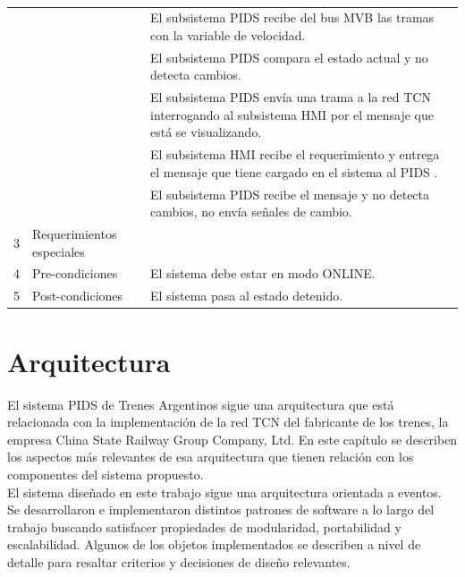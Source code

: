 \begin{table}[]
\begin{tabular}{|lll|}
\multicolumn{1}{|l|}{{ }} & \multicolumn{1}{l|}{{ }} & { El subsistema PIDS recibe del bus MVB las tramas con la variable de velocidad.} \\
 
\multicolumn{1}{|l|}{{ }} & \multicolumn{1}{l|}{{ }} & { El subsistema PIDS compara el estado actual y no detecta cambios.} \\
 
\multicolumn{1}{|l|}{{ }} & \multicolumn{1}{l|}{{ }} & { El subsistema PIDS envía una trama a la red TCN interrogando al subsistema HMI por el mensaje que está se visualizando.} \\
 
\multicolumn{1}{|l|}{{ }} & \multicolumn{1}{l|}{{ }} & { El subsistema HMI recibe el requerimiento y entrega el mensaje que tiene cargado en el sistema al PIDS .} \\
 
\multicolumn{1}{|l|}{{ }} & \multicolumn{1}{l|}{{ }} & { El subsistema PIDS recibe el mensaje y no detecta cambios, no envía señales de cambio.} \\ \hline
 
\multicolumn{1}{|r|}{{ 3}} & \multicolumn{1}{l|}{{ Requerimientos especiales}} & { } \\ \hline
 
\multicolumn{1}{|r|}{{ 4}} & \multicolumn{1}{l|}{{ Pre-condiciones}} & { El sistema debe estar en modo ONLINE.} \\ \hline
 
\multicolumn{1}{|r|}{{ 5}} & \multicolumn{1}{l|}{{ Post-condiciones}} & { El sistema pasa al estado detenido.} \\ \hline
\end{tabular}
\caption{}
\label{tab:my-table}
\end{table}


\pagebreak
\newpage
\section{Arquitectura}

El sistema PIDS de Trenes Argentinos sigue una arquitectura que está relacionada con la implementación de la red TCN del fabricante de los trenes, la empresa China State Railway Group Company, Ltd. En este capítulo se describen los aspectos más relevantes de esa arquitectura que tienen relación con los componentes del sistema propuesto.\\

El sistema diseñado en este trabajo sigue una arquitectura orientada a eventos. Se desarrollaron e implementaron distintos patrones de software a lo largo del trabajo buscando satisfacer propiedades de modularidad, portabilidad y escalabilidad. Algunos de los objetos implementados se describen a nivel de detalle para resaltar criterios y decisiones de diseño relevantes. \\

